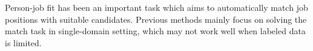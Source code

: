 Person-job fit has been an important task which aims to automatically match job positions with suitable candidates. 
Previous methods mainly focus on solving the match task in single-domain setting, which may not work well when labeled data is limited.
